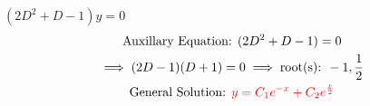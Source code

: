 \item [5.] $(2D^2+D-1)y=0$
\begin{gather*}
    \text{Auxillary Equation: }(2D^2+D-1)=0\\
    \implies (2D-1)(D+1)=0 \implies \text{root(s): } -1,\frac{1}{2}\\
    \text{General Solution: } \textcolor{red}{y=C_1e^{-x}+C_2e^{\frac{x}{2}}}
\end{gather*}